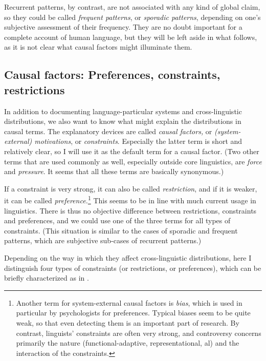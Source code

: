 \documentclass[output=paper]{langsci/langscibook}
\begin{document}
Recurrent patterns, by contrast, are not associated with any kind of global claim, so they could be called \textit{frequent patterns}, or \textit{sporadic patterns}, depending on one’s subjective assessment of their frequency. They are no doubt important for a complete account of human language, but they will be left aside in what follows, as it is not clear what causal factors might illuminate them.

\subsection{Causal factors: Preferences, constraints, restrictions}\label{sec:haspelmath:2.3}


In addition to documenting language-particular systems and cross-linguistic distributions, we also want to know what might explain the distributions in causal terms. The explanatory devices are called \textit{causal factors,} or \textit{(system-external) motivations}, or \textit{constraints}. Especially the latter term is short and relatively clear, so I will use it as the default term for a causal factor. (Two other terms that are used commonly as well, especially outside core linguistics, are \textit{force} and \textit{pressure}. It seems that all these terms are basically synonymous.)

If a constraint is very strong, it can also be called \textit{restriction}, and if it is weaker, it can be called \textit{preference.}\footnote{Another term for system-external causal factors is \textit{bias}, which is used in particular by psychologists for  preferences. Typical biases seem to be quite weak, so that even detecting them is an important part of research. By contrast, linguists’ constraints are often very strong, and controversy concerns primarily the nature (functional-adap\-tive, representational, al) and the interaction of the constraints.} This seems to be in line with much current usage in linguistics. There is thus no objective difference between restrictions, constraints and preferences, and we could use one of the three terms for all types of constraints. (This situation is similar to the cases of sporadic and frequent patterns, which are subjective sub-cases of recurrent patterns.)

Depending on the way in which they affect cross-linguistic distributions, here I distinguish four types of constraints (or restrictions, or preferences), which can be briefly characterized as in .
\end{document}
